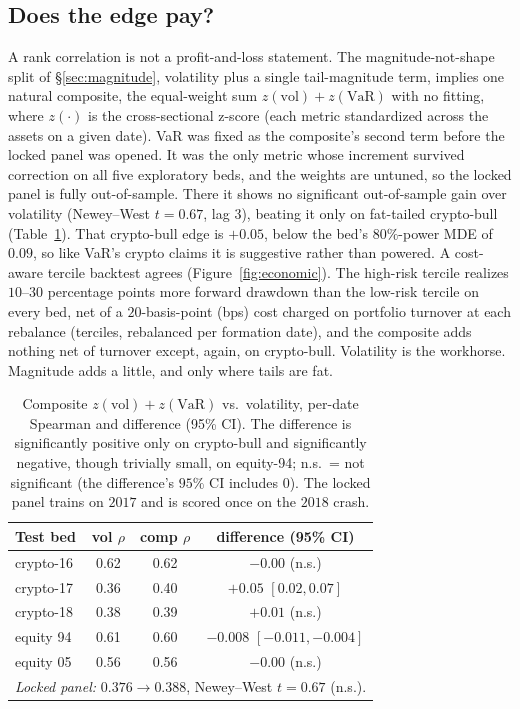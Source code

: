 \documentclass[sigconf,anonymous,nonacm]{acmart}
\begin{document}
\subsection{Does the edge pay?}
A rank correlation is not a profit-and-loss statement.
The magnitude-not-shape split of \S\ref{sec:magnitude}, volatility plus a single
tail-magnitude term, implies one natural composite, the equal-weight sum
$z(\text{vol})+z(\text{VaR})$ with no fitting, where $z(\cdot)$ is the cross-sectional
z-score (each metric standardized across the assets on a given date). VaR was fixed as the
composite's second term before the locked panel was opened. It was the only metric whose
increment survived correction on all five exploratory beds, and the weights are untuned,
so the locked panel is fully out-of-sample. There it shows no significant out-of-sample
gain over volatility (Newey--West $t=0.67$, lag $3$), beating it only on fat-tailed
crypto-bull (Table~\ref{tab:econ}). That crypto-bull edge is $+0.05$, below the bed's
$80\%$-power MDE of $0.09$, so like VaR's crypto claims it is suggestive rather than
powered. A cost-aware tercile backtest agrees (Figure~\ref{fig:economic}). The
high-risk tercile realizes $10$--$30$ percentage points more forward drawdown than the
low-risk tercile on every bed, net of a $20$-basis-point (bps) cost charged on portfolio
turnover at each rebalance (terciles, rebalanced per formation date), and the composite
adds nothing net of turnover except, again, on crypto-bull. Volatility is the workhorse.
Magnitude adds a little, and only where tails are fat.

\begin{table}[t]
\centering
\caption{Composite $z(\text{vol})+z(\text{VaR})$ vs.\ volatility, per-date Spearman
and difference (95\% CI). The difference is significantly positive only on crypto-bull and
significantly negative, though trivially small, on equity-94; n.s.\ = not significant (the
difference's $95\%$ CI includes $0$). The locked panel trains on $2017$ and is scored once
on the $2018$ crash.}
\label{tab:econ}
\small
\begin{tabular}{lccc}
\toprule
Test bed & vol $\rho$ & comp $\rho$ & difference (95\% CI) \\
\midrule
crypto-16 & 0.62 & 0.62 & $-0.00$ (n.s.) \\
crypto-17 & 0.36 & 0.40 & $+0.05$ $[0.02,0.07]$ \\
crypto-18 & 0.38 & 0.39 & $+0.01$ (n.s.) \\
equity 94 & 0.61 & 0.60 & $-0.008$ $[-0.011,-0.004]$ \\
equity 05 & 0.56 & 0.56 & $-0.00$ (n.s.) \\
\midrule
\multicolumn{4}{l}{\emph{Locked panel:} $0.376 \rightarrow 0.388$, Newey--West $t=0.67$ (n.s.).}\\
\bottomrule
\end{tabular}
\end{table}
\end{document}
